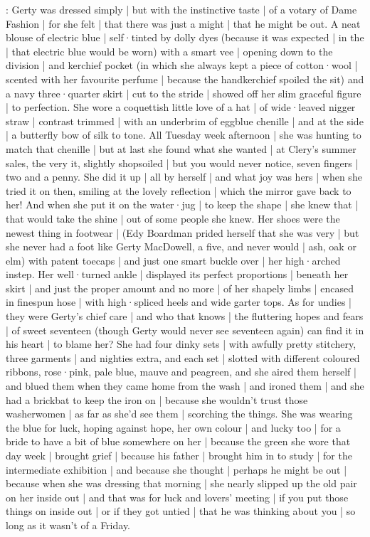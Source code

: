 :
Gerty was dressed simply |
but with the instinctive taste |
of a votary of Dame Fashion |
for she felt |
that there was just a might |
that he might be out.
A neat blouse of electric blue |
self·tinted by dolly dyes
(because it was expected |
in the  |
that electric blue would be worn)
with a smart vee |
opening down to the division |
and kerchief pocket
(in which
she always kept a piece of cotton·wool |
scented with her favourite perfume |
because the handkerchief spoiled the sit)
and a navy three·quarter skirt |
cut to the stride |
showed off her slim graceful figure |
to perfection.
She wore a coquettish little love of a hat |
of wide·leaved nigger straw |
contrast trimmed |
with an underbrim of eggblue chenille |
and at the side |
a butterfly bow of silk to tone.
All Tuesday week afternoon |
she was hunting to match that chenille |
but at last
she found what she wanted |
at Clery's summer sales,
the very it,
slightly shopsoiled |
but you would never notice,%
seven fingers |
two and a penny.
She did it up |
all by herself |
and what joy was hers |
when she tried it on then,
smiling at the lovely reflection |
which the mirror gave back to her!
And when she put it on the water·jug |
to keep the shape |
she knew that |
that would take the shine |
out of some people she knew.
Her shoes were the newest thing in footwear |
(Edy Boardman prided herself that she was very  |
but she never had a foot like Gerty MacDowell,
a five,
and never would |
ash, oak or elm)
with patent toecaps |
and just one smart buckle over |
her high·arched instep.
Her well·turned ankle |
displayed its perfect proportions |
beneath her skirt |
and just the proper amount and no more |
of her shapely limbs |
encased in finespun hose |%
with high·spliced heels and wide garter tops.
As for undies |
they were Gerty's chief care |
and who that knows |
the fluttering hopes and fears |
of sweet seventeen
(though Gerty would never see seventeen again)
can find it in his heart |
to blame her?
She had four dinky sets |
with awfully pretty stitchery,
three garments |
and nighties extra,
and each set |
slotted with different coloured ribbons,
rose·pink,
pale blue,
mauve
and peagreen,
and she aired them herself |
and blued them
when they came home from the wash |
and ironed them |
and she had a brickbat to keep the iron on |
because she wouldn't trust those washerwomen |
as far as she'd see them |
scorching the things.
She was wearing the blue for luck,
hoping against hope,%
her own colour |
and lucky too |
for a bride to have a bit of blue somewhere on her |
because the green she wore that day week |
brought grief |
because his father |
brought him in to study |
for the intermediate exhibition |
and because she thought |
perhaps he might be out |
because when she was dressing that morning |
she nearly slipped up the old pair on her inside out |
and that was for luck and lovers' meeting |
if you put those things on inside out |
or if they got untied |
that he was thinking about you |
so long as it wasn't of a Friday.


